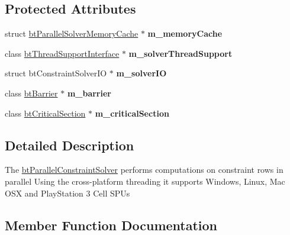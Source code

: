 \subsection*{Protected Attributes}
\begin{DoxyCompactItemize}
\item 
\mbox{\label{classbtParallelConstraintSolver_aed1661e0f51e762d94271fec3a876bd9}} 
struct \hyperlink{structbtParallelSolverMemoryCache}{bt\+Parallel\+Solver\+Memory\+Cache} $\ast$ {\bfseries m\+\_\+memory\+Cache}
\item 
\mbox{\label{classbtParallelConstraintSolver_a378c926c91285a75649f950f3ebd2ba0}} 
class \hyperlink{classbtThreadSupportInterface}{bt\+Thread\+Support\+Interface} $\ast$ {\bfseries m\+\_\+solver\+Thread\+Support}
\item 
\mbox{\label{classbtParallelConstraintSolver_a1cec37de98a0a04608b80f093774208e}} 
struct bt\+Constraint\+Solver\+IO $\ast$ {\bfseries m\+\_\+solver\+IO}
\item 
\mbox{\label{classbtParallelConstraintSolver_a7af681c84a54909408d55a63fd088436}} 
class \hyperlink{classbtBarrier}{bt\+Barrier} $\ast$ {\bfseries m\+\_\+barrier}
\item 
\mbox{\label{classbtParallelConstraintSolver_a1b966ca32804503ca4a90be438678dbc}} 
class \hyperlink{classbtCriticalSection}{bt\+Critical\+Section} $\ast$ {\bfseries m\+\_\+critical\+Section}
\end{DoxyCompactItemize}


\subsection{Detailed Description}
The \hyperlink{classbtParallelConstraintSolver}{bt\+Parallel\+Constraint\+Solver} performs computations on constraint rows in parallel Using the cross-\/platform threading it supports Windows, Linux, Mac O\+SX and Play\+Station 3 Cell S\+P\+Us 

\subsection{Member Function Documentation}
\mbox{\label{classbtParallelConstraintSolver_a2713bd22bd322034ba8470186105ff22}} 
